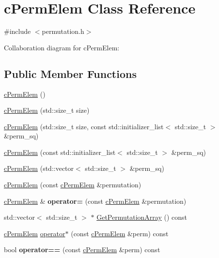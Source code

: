 \hypertarget{classcPermElem}{\section{c\-Perm\-Elem Class Reference}
\label{classcPermElem}
}


{\ttfamily \#include $<$permutation.\-h$>$}



Collaboration diagram for c\-Perm\-Elem\-:
\subsection*{Public Member Functions}
\begin{DoxyCompactItemize}
\item 
\hyperlink{classcPermElem_a9170fa558dd3cdfae7879631db41235d}{c\-Perm\-Elem} ()
\item 
\hyperlink{classcPermElem_ad3ff2e93580acca710249f0eb7e04bc3}{c\-Perm\-Elem} (std\-::size\-\_\-t size)
\item 
\hyperlink{classcPermElem_a375e3da4877dd48e93ca192bfcd66ddd}{c\-Perm\-Elem} (std\-::size\-\_\-t size, const std\-::initializer\-\_\-list$<$ std\-::size\-\_\-t $>$ \&perm\-\_\-sq)
\item 
\hyperlink{classcPermElem_a88b976442227c8da9ede9cf9d3f865c5}{c\-Perm\-Elem} (const std\-::initializer\-\_\-list$<$ std\-::size\-\_\-t $>$ \&perm\-\_\-sq)
\item 
\hyperlink{classcPermElem_a05895c11888d83bc3d35b3c18d90e8e4}{c\-Perm\-Elem} (std\-::vector$<$ std\-::size\-\_\-t $>$ \&perm\-\_\-sq)
\item 
\hyperlink{classcPermElem_a9cdd0f485986e63a7a848a058aecf402}{c\-Perm\-Elem} (const \hyperlink{classcPermElem}{c\-Perm\-Elem} \&permutation)
\item 
\hypertarget{classcPermElem_a9c05e75d5c9ce57fafc2cee73e396a58}{\hyperlink{classcPermElem}{c\-Perm\-Elem} \& {\bfseries operator=} (const \hyperlink{classcPermElem}{c\-Perm\-Elem} \&permutation)}\label{classcPermElem_a9c05e75d5c9ce57fafc2cee73e396a58}

\item 
std\-::vector$<$ std\-::size\-\_\-t $>$ $\ast$ \hyperlink{classcPermElem_a0d0bfc94a1d7cf92d514293253acf8be}{Get\-Permutation\-Array} () const 
\item 
\hyperlink{classcPermElem}{c\-Perm\-Elem} \hyperlink{classcPermElem_a19da6e521f8adf3d252250f3836c563e}{operator$\ast$} (const \hyperlink{classcPermElem}{c\-Perm\-Elem} \&perm) const 
\item 
\hypertarget{classcPermElem_a925aac2e4ac73ec288b7a1e16b941d40}{bool {\bfseries operator==} (const \hyperlink{classcPermElem}{c\-Perm\-Elem} \&perm) const }\label{classcPermElem_a925aac2e4ac73ec288b7a1e16b941d40}


\end{DoxyCompactItemize}
